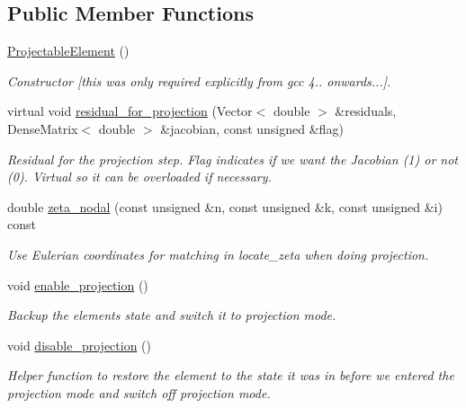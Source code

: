 \subsection*{Public Member Functions}
\begin{DoxyCompactItemize}
\item 
\hyperlink{classoomph_1_1ProjectableElement_a1892a2e757d35952be803d56078a3320}{Projectable\+Element} ()
\begin{DoxyCompactList}\small\item\em Constructor \mbox{[}this was only required explicitly from gcc 4.. onwards...\mbox{]}. \end{DoxyCompactList}\item 
virtual void \hyperlink{classoomph_1_1ProjectableElement_a1ff7a9207ec5e4fc2508e75064e136de}{residual\+\_\+for\+\_\+projection} (Vector$<$ double $>$ \&residuals, Dense\+Matrix$<$ double $>$ \&jacobian, const unsigned \&flag)
\begin{DoxyCompactList}\small\item\em Residual for the projection step. Flag indicates if we want the Jacobian (1) or not (0). Virtual so it can be overloaded if necessary. \end{DoxyCompactList}\item 
double \hyperlink{classoomph_1_1ProjectableElement_aefceb50221fe76ac929d618495530adf}{zeta\+\_\+nodal} (const unsigned \&n, const unsigned \&k, const unsigned \&i) const
\begin{DoxyCompactList}\small\item\em Use Eulerian coordinates for matching in locate\+\_\+zeta when doing projection. \end{DoxyCompactList}\item 
void \hyperlink{classoomph_1_1ProjectableElement_a08968691986cf6dbe45e5c20d46e46be}{enable\+\_\+projection} ()
\begin{DoxyCompactList}\small\item\em Backup the element\textquotesingle{}s state and switch it to projection mode. \end{DoxyCompactList}\item 
void \hyperlink{classoomph_1_1ProjectableElement_afd30334bf9f7cf2e9d210b7705bd8572}{disable\+\_\+projection} ()
\begin{DoxyCompactList}\small\item\em Helper function to restore the element to the state it was in before we entered the projection mode and switch off projection mode. \end{DoxyCompactList}\item 

\end{DoxyCompactItemize}
